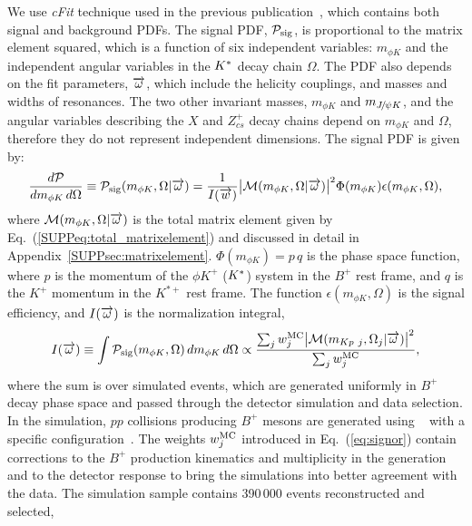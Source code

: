 We use \emph{cFit} technique used in the previous publication~\supercite{LHCb-PAPER-2016-018}, which contains both signal and background PDFs.
The signal PDF, ${\cal P}_{\rm sig}$,
is proportional to the matrix element squared, which 
is a function of six independent variables: 
$m_{\phi K}$ 
and the independent angular variables in the ${{K}^*}$ decay chain $\Omega$. 
%
The PDF also depends on the fit parameters, $\overrightarrow{\omega}$, which include the 
helicity couplings, and masses and widths of resonances. 
%
The two other invariant masses, $m_{\phi K}$ and $m_{{{J\mskip -3mu/\mskip -2mu\psi}} K}$, and 
the angular variables describing the $X$ and $Z_{cs}^+$ decay chains 
depend on $m_{\phi K}$ and $\Omega$, therefore they do not represent independent dimensions. 
%
The signal PDF is given by:
\begin{equation}
\label{eq:sigpdfsplot}
\frac{d{\cal P}}{d m_{\phi K}\,d\Omega} \equiv {\cal P}_{\rm sig}(m_{\phi K},\Omega|\overrightarrow{\omega})
=\frac{1}{I(\overrightarrow{w})}\big|\mathcal{M}(m_{\phi K},\Omega| \overrightarrow{\omega})\big|^2
\Phi(m_{\phi K})
\epsilon(m_{\phi K},\Omega),
\end{equation}
where $\mathcal{M}(m_{\phi K},\Omega|\overrightarrow{\omega})$ is the total matrix element given by Eq.~(\ref{SUPPeq:total_matrixelement}) and discussed in detail in Appendix~\ref{SUPPsec:matrixelement}. 
$\Phi(m_{\phi K})=p\,q$ is the phase space function, where $p$ is the momentum of
the $\phi K^+$ (\ie ${{K}^*}$) system in the $B^+$ rest frame, and $q$ is the $K^+$ momentum 
in the $K^{*+}$ rest frame.
The function $\epsilon(m_{\phi K},\Omega)$ is the signal efficiency, and
$I(\overrightarrow{\omega})$ is the normalization integral,
\begin{equation}
I(\overrightarrow{\omega})\equiv \int {\cal P}_{\rm sig}(m_{\phi K},\Omega)\,d m_{\phi K}\,d\Omega \propto
\frac{\sum_j w_j^{\rm MC}\big|\mathcal{M}(m_{Kp~j},\Omega_j|\overrightarrow{\omega})\big|^2}{\sum_j w_j^{\rm MC}},
\label{eq:signor}
\end{equation}
where the sum is over simulated events, which are
generated uniformly in $B^+$ decay phase space 
and passed through the detector simulation \supercite{LHCb-PROC-2011-006}
and data selection.
In the simulation, $pp$ collisions producing $B^+$ mesons are generated using
\pythia~\supercite{Sjostrand:2006za}  with a specific \lhcb
configuration~\supercite{LHCb-PROC-2010-056}. 
The weights $w_j^{\rm MC}$ introduced in Eq.~(\ref{eq:signor}) contain 
corrections to the $B^+$ production kinematics and multiplicity in the generation 
and to the detector response 
to bring the simulations into better agreement with the data.
The simulation sample contains 390\,000 events reconstructed and selected,
